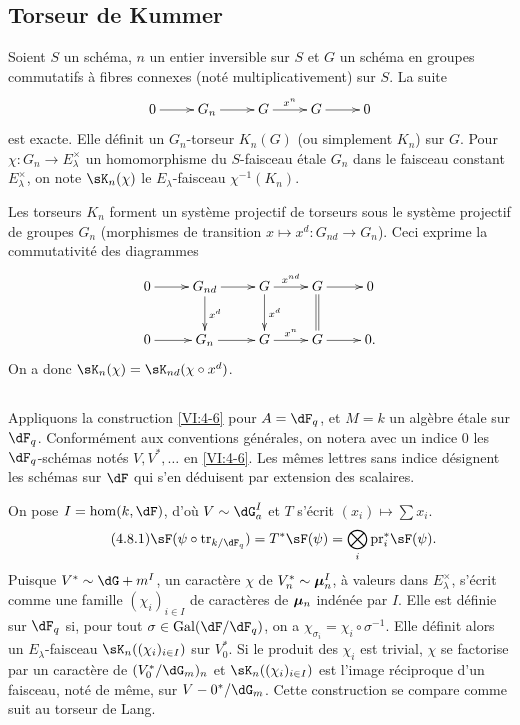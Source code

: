 \subsection{Torseur de Kummer}\label{VI:4-7}

Soient $S$ un schéma, $n$ un entier inversible sur $S$ et $G$ un schéma en 
groupes commutatifs à fibres connexes (noté multiplicativement) sur $S$. 
La suite 
\[\xymatrix{
  0 \ar[r] 
    & G_n \ar[r] 
    & G \ar[r]^-{x^n} 
    & G \ar[r] 
    & 0 
}\]
est exacte. Elle définit un $G_n$-torseur $K_n(G)$ (ou simplement $K_n$) sur 
$G$. Pour $\chi:G_n \to E_\lambda^\times$ un homomorphisme du $S$-faisceau 
étale $G_n$ dans le faisceau constant $E_\lambda^\times$, on note 
$\sK_n(\chi)$ le $E_\lambda$-faisceau $\chi^{-1}(K_n)$. 

Les torseurs $K_n$ forment un système projectif de torseurs sous le 
système projectif de groupes $G_n$ (morphismes de transition 
$x\mapsto x^d:G_{n d}\to G_n$). Ceci exprime la commutativité des diagrammes 
\[\xymatrix{
  0 \ar[r] 
    & G_{n d} \ar[r] \ar[d]^-{x^d} 
    & G \ar[r]^-{x^{n d}} \ar[d]^-{x^d} 
    & G \ar[r] \ar@{=}[d] 
    & 0 \\
  0 \ar[r] 
    & G_n \ar[r] 
    & G \ar[r]^-{x^n} 
    & G \ar[r] 
    & 0 \text{.} 
}\]
On a donc $\sK_n(\chi) = \sK_{n d}(\chi\circ x^d)$. 





\subsection{}\label{VI:4-8}

Appliquons la construction \ref{VI:4-6} pour $A=\dF_q$, et $M=k$ un algèbre 
étale sur $\dF_q$. Conformément aux conventions générales, on notera 
avec un indice $0$ les $\dF_q$-schémas notés $V,V^\ast,\ldots$ en 
\ref{VI:4-6}. Les mêmes lettres sans indice désignent les schémas sur 
$\dF$ qui s'en déduisent par extension des scalaires. 

On pose $I=\hom(k,\dF)$, d'où $V\sim \dG_a^I$ et $T$ s'écrit 
$(x_i)\mapsto \sum x_i$. 
\begin{equation*}\tag{4.8.1}\label{VI:eq:4-8-1}
  \sF(\psi\circ \tr_{k/\dF_q}) = T^\ast \sF(\psi) = \bigotimes_i \pr_i^\ast \sF(\psi) \text{.} 
\end{equation*}
Puisque $V^\ast\sim \dG+m^I$, un caractère $\chi$ de $V_n^\ast\sim {\bm\mu}_n^I$, 
à valeurs dans $E_\lambda^\times$, s'écrit comme une famille 
$(\chi_i)_{i\in I}$ de caractères de ${\bm\mu}_n$ indénée par $I$. Elle est 
définie sur $\dF_q$ si, pour tout $\sigma\in \gal(\dF/\dF_q)$, on a 
$\chi_{\sigma_i} = \chi_i\circ \sigma^{-1}$. Elle définit alors un 
$E_\lambda$-faisceau $\sK_n((\chi_i)_{i\in I})$ sur $V_0^\ast$. Si le produit 
des $\chi_i$ est trivial, $\chi$ se factorise par un caractère de 
$(V_0^\ast/\dG_m)_n$ et $\sK_n((\chi_i)_{i\in I})$ est l'image réciproque 
d'un faisceau, noté de même, sur $V-0^\ast/\dG_m$. Cette construction se 
compare comme suit au torseur de Lang. 





